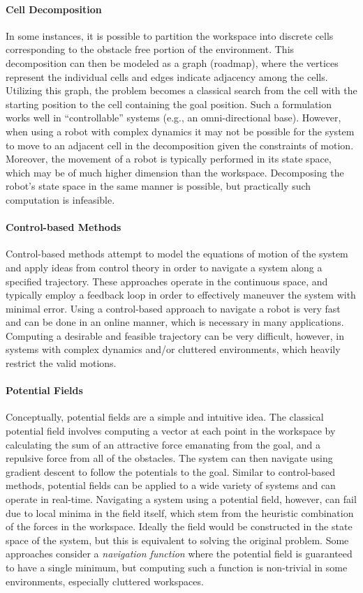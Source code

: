 \paragraph {Cell Decomposition}
In some instances, it is possible to partition the workspace into discrete
cells corresponding to the obstacle free portion of the environment.  This
decomposition can then be modeled as a graph (roadmap), where the vertices
represent the individual cells and edges indicate adjacency among the cells.
Utilizing this graph, the problem becomes a classical search from the cell with
the starting position to the cell containing the goal position.  Such a
formulation works well in ``controllable'' systems (e.g., an omni-directional base).
However, when using a robot with complex dynamics it may not be possible for the
system to move to an adjacent cell in the decomposition given the constraints
of motion.  Moreover, the movement of a robot is typically performed in its
state space, which may be of much higher dimension than the workspace.
Decomposing the robot's state space in the same manner is possible, but
practically such computation is infeasible.

\paragraph {Control-based Methods}
Control-based methods attempt to model the equations of motion of the system
and apply ideas from control theory in order to navigate a system along a
specified trajectory.  These approaches operate in the continuous space, and
typically employ a feedback loop in order to effectively maneuver the system
with minimal error.  Using a control-based approach to navigate a robot is
very fast and can be done in an online manner, which is necessary in many
applications.  Computing a desirable and feasible trajectory can be very
difficult, however, in systems with complex dynamics and/or cluttered
environments, which heavily restrict the valid motions.

\paragraph {Potential Fields}
Conceptually, potential fields are a simple and intuitive idea.  The classical
potential field involves computing a vector at each point in the workspace by
calculating the sum of an attractive force emanating from the goal, and a
repulsive force from all of the obstacles. The system can then navigate
using gradient descent to follow the potentials to the goal. Similar to
control-based methods, potential fields can be applied to a wide variety of
systems and can operate in real-time.  Navigating a system using a potential
field, however, can fail due to local minima in the field itself, which stem
from the heuristic combination of the forces in the workspace.  Ideally the
field would be constructed in the state space of the system, but this is
equivalent to solving the original problem.  Some approaches consider a {\it
navigation function} where the potential field is guaranteed to have a single
minimum, but computing such a function is non-trivial in some environments,
especially cluttered workspaces.

